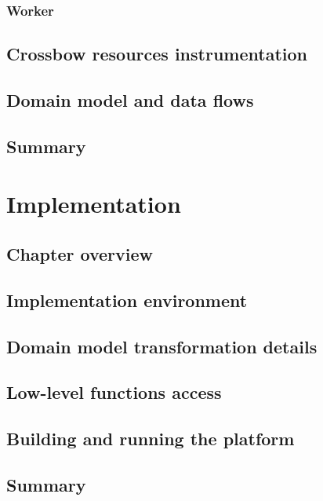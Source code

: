 \documentclass[11pt]{book}
\begin{document}
      \subsection{Worker}


    \section{Crossbow resources instrumentation}


    \section{Domain model and data flows}


    \section{Summary}


  \chapter{Implementation}
    
    \section{Chapter overview}


    \section{Implementation environment}


    \section{Domain model transformation details}


    \section{Low-level functions access}


    \section{Building and running the platform}


    \section{Summary}
\end{document}
